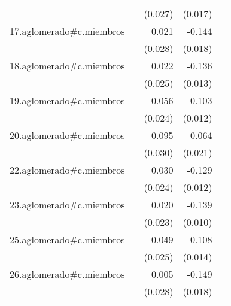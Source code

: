 {\begin{longtable}{l*{4}{D{.}{.}{-1}}}
            &                     &     (0.027)         &     (0.017)         &                     \\
\addlinespace
17.aglomerado#c.miembros&                     &       0.021         &      -0.144\sym{***}&                     \\
            &                     &     (0.028)         &     (0.018)         &                     \\
\addlinespace
18.aglomerado#c.miembros&                     &       0.022         &      -0.136\sym{***}&                     \\
            &                     &     (0.025)         &     (0.013)         &                     \\
\addlinespace
19.aglomerado#c.miembros&                     &       0.056\sym{*}  &      -0.103\sym{***}&                     \\
            &                     &     (0.024)         &     (0.012)         &                     \\
\addlinespace
20.aglomerado#c.miembros&                     &       0.095\sym{**} &      -0.064\sym{**} &                     \\
            &                     &     (0.030)         &     (0.021)         &                     \\
\addlinespace
22.aglomerado#c.miembros&                     &       0.030         &      -0.129\sym{***}&                     \\
            &                     &     (0.024)         &     (0.012)         &                     \\
\addlinespace
23.aglomerado#c.miembros&                     &       0.020         &      -0.139\sym{***}&                     \\
            &                     &     (0.023)         &     (0.010)         &                     \\
\addlinespace
25.aglomerado#c.miembros&                     &       0.049         &      -0.108\sym{***}&                     \\
            &                     &     (0.025)         &     (0.014)         &                     \\
\addlinespace
26.aglomerado#c.miembros&                     &       0.005         &      -0.149\sym{***}&                     \\
            &                     &     (0.028)         &     (0.018)         &                     \\

\end{longtable}}
